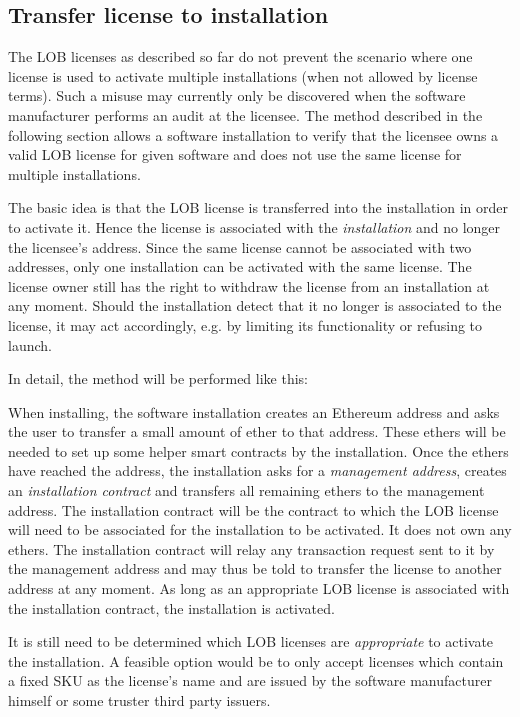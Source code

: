\documentclass[a4paper]{article}
\begin{document}
\subsection{Transfer license to installation}
\label{ch:installationContract}

The LOB licenses as described so far do not prevent the scenario where one license is used to activate multiple installations (when not allowed by license terms). Such a misuse may currently only be discovered when the software manufacturer performs an audit at the licensee. The method described in the following section allows a software installation to verify that the licensee owns a valid LOB license for given software and does not use the same license for multiple installations.

The basic idea is that the LOB license is transferred into the installation in order to activate it. Hence the license is associated with the \emph{installation} and no longer the licensee's address. Since the same license cannot be associated with two addresses, only one installation can be activated with the same license. The license owner still has the right to withdraw the license from an installation at any moment. Should the installation detect that it no longer is associated to the license, it may act accordingly, e.g. by limiting its functionality or refusing to launch.

In detail, the method will be performed like this:

When installing, the software installation creates an Ethereum address and asks the user to transfer a small amount of ether to that address. These ethers will be needed to set up some helper smart contracts by the installation. Once the ethers have reached the address, the installation asks for a \emph{management address}, creates an \emph{installation contract} and transfers all remaining ethers to the management address. The installation contract will be the contract to which the LOB license will need to be associated for the installation to be activated. It does not own any ethers. The installation contract will relay any transaction request sent to it by the management address and may thus be told to transfer the license to another address at any moment. As long as an appropriate LOB license is associated with the installation contract, the installation is activated.

It is still need to be determined which LOB licenses are \emph{appropriate} to activate the installation. A feasible option would be to only accept licenses which contain a fixed SKU as the license's name and are issued by the software manufacturer himself or some truster third party issuers.
\end{document}
